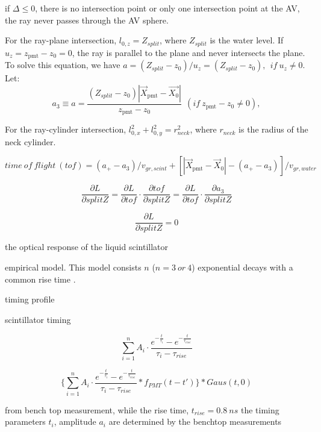 if $\Delta\leq0$,
there is no intersection point or only one intersection point at the AV, the ray never passes through the AV sphere.

For the ray-plane intersection, 
$l_{0,z} = Z_{split}$, where $Z_{split}$ is the water level.
If $u_z=z_\mathrm{pmt}-z_0=0$, the ray is parallel to the plane and never intersects the plane.
To solve this equation, we have $a=(Z_{split}-z_0)/u_z=(Z_{split}-z_0),~~if~u_z\neq 0$.
Let: 
\[
a_3 \equiv a = \frac{(Z_{split}-z_0)|\vec{X}_{\mathrm{pmt}}-\vec{X_0}|}{z_\mathrm{pmt}-z_0}~~(if ~z_\mathrm{pmt}-z_0\neq 0),
\]


For the ray-cylinder intersection,
$l^2_{0,x}+l^2_{0,y} = r^2_{neck}$, where $ r_{neck}$ is the radius of the neck cylinder.

\[time~of~flight~(tof)=
(a_+-a_3)/v_{gr,scint}+[|\vec{X}_{\mathrm{pmt}}-\vec{X}_0|-(a_+-a_3)]/v_{gr,water}
\]


\[
\frac{\partial L}{\partial splitZ} = \frac{\partial L}{\partial tof}\cdot\frac{\partial tof}{\partial splitZ}=\frac{\partial L}{\partial tof}\cdot\frac{\partial a_3}{\partial splitZ}
\]


\[
\frac{\partial L}{\partial splitZ} = 0
\]

the optical response of the liquid scintillator

empirical model. This model consists $n$ ($n=3~or~4$) exponential decays  with a common rise time \cite{biller2020slow}.

timing profile 




scintillator timing

\[\sum^{n}_{i=1}A_i\cdot\frac{e^{-\frac{t}{\tau_i}}-e^{-\frac{t}{\tau_{rise}}}}{\tau_i-\tau_{rise}}
\]


\[
\{\sum^{n}_{i=1}A_i\cdot\frac{e^{-\frac{t}{\tau_i}}-e^{-\frac{t}{\tau_{rise}}}}{\tau_i-\tau_{rise}}*f_{PMT}(t-t')\}*Gaus(t,0)
\]

from bench top measurement, 
while the rise time, $t_{rise} = 0.8~ns$ the timing parameters $t_i$,
amplitude $a_i$ are determined by the benchtop measurements 

